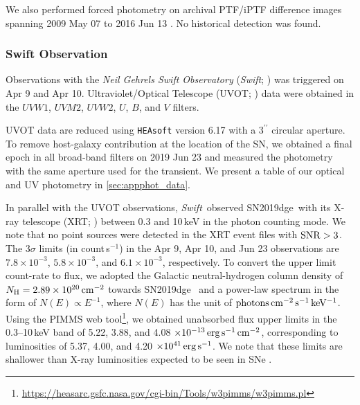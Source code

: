 \documentclass[twocolumn]{aastex63}
\newcommand{\name}{SN2019dge}
\newcommand{\swift}{\textit{Swift}}
\begin{document}
We also performed forced photometry on archival PTF/iPTF difference images spanning 2009 May 07 to 
2016 Jun 13 \citep{Law2009, Rau2009}. No historical detection was found. 

 
 
\subsubsection{Swift Observation}\label{subsubsec:swift}
Observations with the \textit{Neil Gehrels Swift Observatory} (\swift; 
\citealt{Gehrels2004}) was triggered on Apr 9 and Apr 10. Ultraviolet/Optical Telescope (UVOT; 
\citealt{Roming2005}) data were obtained in the $UVW1$, $UVM2$, $UVW2$, $U$, $B$, and $V$ 
filters. 

UVOT data are reduced using \texttt{HEAsoft} \citep{Heasarc} version 6.17 with a $3^{\prime\prime}$ 
circular aperture. To remove host-galaxy contribution at the location of the SN, we obtained a final 
epoch in all broad-band filters 
on 2019 Jun 23 and measured the photometry with the same aperture used for the transient. We 
present a table of our optical and UV photometry in \ref{sec:appphot_data}.


In parallel with the UVOT observations, \swift\ observed \name\ with its X-ray telescope
(XRT; \citealt{Burrows2005}) between 0.3 and 10\,keV in the photon counting mode. We note that no 
point sources were detected in the XRT event files with $\rm{SNR}>3$. The 3$\sigma$ limits (in 
count\,s$^{-1}$) in the Apr 9, Apr 10, and Jun 23 observations are $7.8\times 
10^{-3}$, $5.8\times 10^{-3}$, and $6.1\times 10^{-3}$, respectively. 
To convert the upper limit count-rate to flux, we adopted the Galactic neutral-hydrogen column 
density of $N_{\rm H} = 2.89\times 10^{20}\,{\rm cm^{-2}}$ towards \name\ \citep{Willingale2013} and a 
power-law spectrum in the form of $N(E) \propto E^{-1}$, where $N(E)$ has the unit of $\rm 
photons\,cm^{-2}\,s^{-1}\,keV^{-1}$. Using the PIMMS web 
tool\footnote{\url{https://heasarc.gsfc.nasa.gov/cgi-bin/Tools/w3pimms/w3pimms.pl}}, we obtained 
unabsorbed flux upper limits in the 0.3--10\,keV band of 5.22, 3.88, and 4.08 $\times 
10^{-13}\,{\rm erg\,s^{-1}\,cm^{-2}}$, corresponding to luminosities of 5.37, 4.00, and 4.20 $\times 
10^{41}\,{\rm erg\,s^{-1}}$. We note that these limits are shallower than X-ray luminosities expected to 
be seen in SNe \citep{OfekXray2013}.
\end{document}
